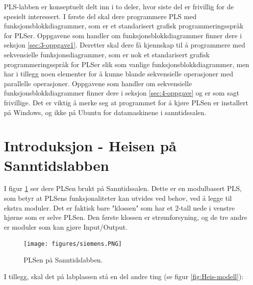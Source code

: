 \begin{alphasection}
PLS-labben er konseptuelt delt inn i to deler, hvor siste del er frivillig for de spesielt interessert. I første del skal dere programmere PLS med funksjonsblokkdiagrammer, som er et standarisert grafisk programmeringsspråk for PLSer. Oppgavene som handler om funksjonsblokkdiagrammer finner dere i seksjon \ref{sec:3-oppgave1}. Deretter skal dere få kjennskap til å programmere med sekvensielle funksjonsdiagrammer, som er nok et standarisert grafisk programmeringsspråk for PLSer slik som vanlige funksjonsblokkdiagrammer, men har i tillegg noen elementer for å kunne blande sekvensielle operasjoner med parallelle operasjoner. Oppgavene som handler om sekvensielle funksjonsblokkdiagrammer finner dere i seksjon \ref{sec:4-oppgave} og er som sagt frivillige. Det er viktig å merke seg at programmet for å kjøre PLSen er installert på Windows, og ikke på Ubuntu for datamaskinene i sanntidssalen.






\section{Introduksjon - Heisen på Sanntidslabben}\label{sec:1-intro}



I figur \ref{fig:siemens-pls} ser dere PLSen brukt på Sanntidssalen. Dette er en modulbasert PLS, som betyr at PLSens funksjonaliteter kan utvides ved behov, ved å legge til ekstra moduler. Det er faktisk bare "klossen" som har et 2-tall nede i venstre hjørne som er selve PLSen. Den første klossen er strømforsyning, og de tre andre er moduler som kan gjøre Input/Output. 

\begin{figure}[ht]
    \centering
    \texttt{[image: figures/siemens.PNG]}
    \caption{PLSen på Sanntidslabben.}
    \label{fig:siemens-pls}
\end{figure}

I tillegg, skal det på labplassen stå en del andre ting (se figur \ref{fig:Heis-modell}):



\end{alphasection}
